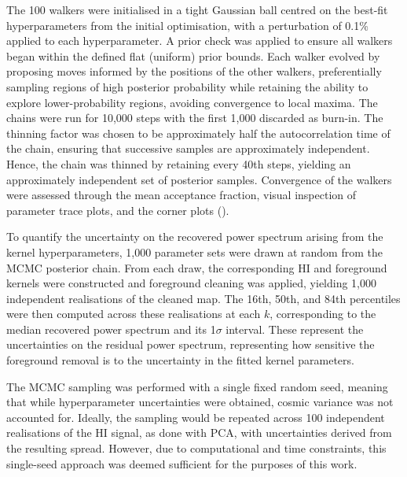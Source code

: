 
The 100 walkers were initialised in a tight Gaussian ball centred on the best-fit hyperparameters from the initial optimisation, with a perturbation of 0.1\% applied to each hyperparameter. A prior check was applied to ensure all walkers began within the defined flat (uniform) prior bounds. Each walker evolved by proposing moves informed by the positions of the other walkers, preferentially sampling regions of high posterior probability while retaining the ability to explore lower-probability regions, avoiding convergence to local maxima. The chains were run for 10,000 steps with the first 1,000 discarded as burn-in. The thinning factor was chosen to be approximately half the autocorrelation time of the chain, ensuring that successive samples are approximately independent. Hence, the chain was thinned by retaining every 40th steps, yielding an approximately independent set of posterior samples. Convergence of the walkers were assessed through the mean acceptance fraction, visual inspection of parameter trace plots, and the corner plots (\cite{foreman-mackeyCornerpyScatterplotMatrices2016a}).

To quantify the uncertainty on the recovered power spectrum arising from the kernel hyperparameters, 1,000 parameter sets were drawn at random from the MCMC posterior chain. From each draw, the corresponding HI and foreground kernels were constructed and foreground cleaning was applied, yielding 1,000 independent realisations of the cleaned map. The 16th, 50th, and 84th percentiles were then computed across these realisations at each $k$, corresponding to the median recovered power spectrum and its 1$\sigma$ interval. These represent the uncertainties on the residual power spectrum, representing how sensitive the foreground removal is to the uncertainty in the fitted kernel parameters. 

The MCMC sampling was performed with a single fixed random seed, meaning that while hyperparameter uncertainties were obtained, cosmic variance was not accounted for. Ideally, the sampling would be repeated across 100 independent realisations of the HI signal, as done with PCA, with uncertainties derived from the resulting spread. However, due to computational and time constraints, this single-seed approach was deemed sufficient for the purposes of this work.